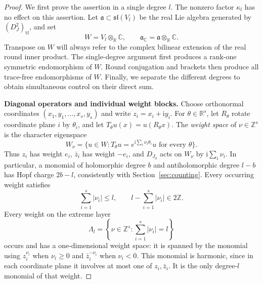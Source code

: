 \begin{proof}
We first prove the assertion in a single degree \(l\).  The nonzero
factor \(\kappa_l\) has no effect on this assertion.  Let
\(\mathfrak a\subset\mathfrak{sl}(V_l)\) be the real Lie algebra
generated by \((D_J^2)_{\mathrm{tf}}\), and set
\[
 W=V_l\otimes_{\mathbb R}\mathbb C,\qquad
 \mathfrak a_{\mathbb C}=\mathfrak a\otimes_{\mathbb R}\mathbb C.
\]
Transpose on \(W\) will always refer to the complex bilinear extension
of the real round inner product.  The single-degree argument first
produces a rank-one symmetric endomorphism of \(W\).  Round conjugation
and brackets then produce all trace-free endomorphisms of \(W\).
Finally, we separate the different degrees to obtain simultaneous
control on their direct sum.

\medskip
\noindent\textbf{Diagonal operators and individual weight blocks.}
Choose orthonormal coordinates
\((x_1,y_1,\ldots,x_s,y_s)\) and write \(z_i=x_i+\mathrm i y_i\).
For \(\theta\in\mathbb R^s\), let \(R_\theta\) rotate coordinate
plane \(i\) by \(\theta_i\), and let \(T_\theta u(x)=u(R_\theta x)\).
The \emph{weight space} of \(\nu\in\mathbb Z^s\) is the character
eigenspace
\[
 W_\nu=\{u\in W:T_\theta u=e^{\mathrm i\sum_i\nu_i\theta_i}u
                    \text{ for every }\theta\}.
\]
Thus \(z_i\) has weight \(e_i\), \(\bar z_i\) has weight \(-e_i\),
and \(D_{J_0}\) acts on \(W_\nu\) by \(\mathrm i\sum_i\nu_i\).
In particular, a monomial of holomorphic degree \(b\) and
antiholomorphic degree \(l-b\) has Hopf charge \(2b-l\), consistently
with Section~\ref{sec:counting}.  Every occurring weight satisfies
\[
 \sum_{i=1}^s|\nu_i|\leq l,\qquad
 l-\sum_{i=1}^s|\nu_i|\in2\mathbb Z.
\]
Every weight on the extreme layer
\[
 \Lambda_l=\left\{\nu\in\mathbb Z^s:
                    \sum_{i=1}^s|\nu_i|=l\right\}
\]
occurs and has a one-dimensional weight space: it is spanned by the
monomial using \(z_i^{\nu_i}\) when \(\nu_i\geq0\) and
\(\bar z_i^{-\nu_i}\) when \(\nu_i<0\).  This monomial is harmonic,
since in each coordinate plane it involves at most one of \(z_i,\bar
z_i\).  It is the only degree-\(l\) monomial of that weight.


\end{proof}
